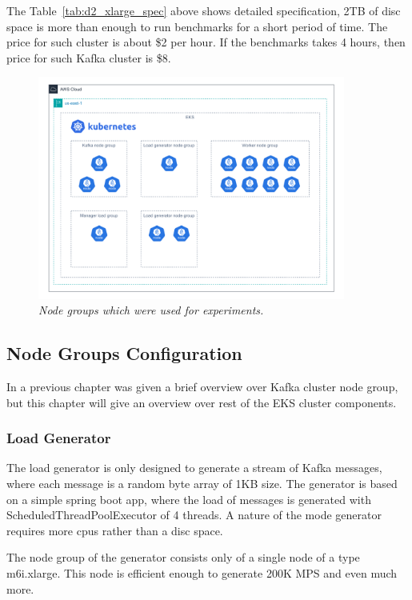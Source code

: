 The Table~\ref{tab:d2_xlarge_spec} above shows detailed specification, 2TB of disc space is more than
enough to run benchmarks for a short period of time.
The price for such cluster is about \$2 per hour.
If the benchmarks takes 4 hours, then price for such Kafka cluster is \$8.


\newpage

\begin{figure}[H]
    \centering
    \includegraphics[width=0.9\textwidth]{figures/eks-node-groups}
    \caption{\textit{Node groups which were used for experiments.}}
    \label{fig:eks-groups-img}
\end{figure}


\subsection{Node Groups Configuration}\label{subsec:node-group}
In a previous chapter was given a brief overview over Kafka cluster node group,
but this chapter will give an overview over rest of the EKS cluster components.


\subsubsection{Load Generator}
The load generator is only designed to generate a stream of Kafka messages, where
each message is a random byte array of 1KB size.
The generator is based on a simple spring boot app, where the load of messages is
generated with ScheduledThreadPoolExecutor of 4 threads.
A nature of the mode generator requires more cpus rather than a disc space.

The node group of the generator consists only of a single node of a type m6i.xlarge.
This node is efficient enough to generate 200K MPS and even much more.

